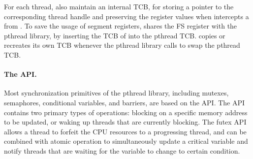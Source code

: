 For each thread, \thelibos{} also maintain an internal TCB,
for storing a pointer to the corresponding thread handle and preserving the register values when \thelibos{} intercepts a \linuxapi{} from \libc{}.
To save the usage of segment registers, \thelibos{} shares the FS register with the pthread library,
by inserting the TCB of \thelibos{} into the pthread TCB.
\thelibos{} copies or recreates its own TCB whenever the pthread library calls  to swap the pthread TCB.



\paragraph{The  API.}
Most synchronization primitives of the pthread library, including mutexes, semaphores, conditional variables, and barriers,
are based on the  API.
The  API contains two primary types of operations:
blocking on a specific memory address to be updated, or waking up threads that are currently blocking. %
The futex API allows a thread to forfeit the CPU resources
to a progressing thread,
and can be combined with atomic operation
to simultaneously update a critical variable and notify threads that are waiting for the variable to change to certain condition.




